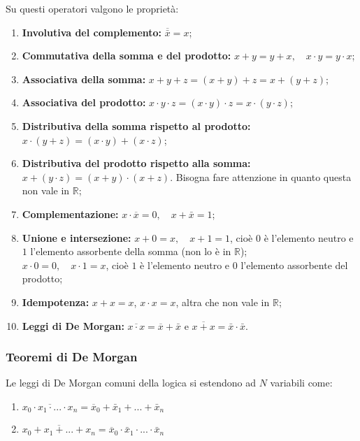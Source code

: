 \documentclass[a4paper,11pt]{article}
\begin{document}
\par\smallskip

Su questi operatori valgono le proprietà:
\begin{enumerate}
	\item \textbf{Involutiva del complemento:} $\overline{\bar{x}} = x$;
	\item \textbf{Commutativa della somma e del prodotto:} $ x + y = y + x, \quad x \cdot y = y \cdot x$;
	\item \textbf{Associativa della somma:} $ x + y + z = (x + y) + z = x + (y + z)$;
	\item \textbf{Associativa del prodotto:} $ x \cdot y \cdot z = (x \cdot y) \cdot z = x \cdot (y \cdot z)$;
	\item \textbf{Distributiva della somma rispetto al prodotto:} $ x \cdot (y + z) = (x \cdot y) + (x \cdot z) $;
	\item \textbf{Distributiva del prodotto rispetto alla somma:} $ x + (y \cdot z) = (x + y) \cdot (x + z) $. Bisogna fare attenzione in quanto questa non vale in $\mathbb{R}$;
	\item \textbf{Complementazione:} $ x \cdot \overline{x} = 0, \quad x + \bar{x} = 1 $;
	\item \textbf{Unione e intersezione:} $ x + 0 = x, \quad x + 1 = 1 $, cioè $0$ è l'elemento neutro e $1$ l'elemento assorbente della somma (non lo è in $\mathbb{R}$); \\
																				$ x \cdot 0 = 0, \quad x \cdot 1 = x $, cioè $1$ è l'elemento neutro e $0$ l'elemento assorbente del prodotto;
	\item \textbf{Idempotenza:} $x + x = x$, \quad $x \cdot x = x$, altra che non vale in $\mathbb{R}$;
	\item \textbf{Leggi di De Morgan:} $\overline{x \cdot x} = \overline{x} + \bar{x}$ e $\overline{x + x} = \bar{x} \cdot \bar{x}$.
\end{enumerate}

\subsubsection{Teoremi di De Morgan}
Le leggi di De Morgan comuni della logica si estendono ad $N$ variabili come:
\begin{enumerate}
	\item $\overline{x_0 \cdot x_1 \cdot ... \cdot x_n} = \overline{x}_0 + \bar{x}_1 + ... + \bar{x}_n$
	\item $\overline{x_0 + x_1 + ... + x_{n}} = \overline{x}_0 \cdot \bar{x}_1 \cdot ... \cdot \bar{x}_n$
\end{enumerate}
\end{document}

